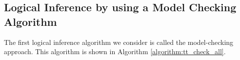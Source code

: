 %
%






\subsection{Logical Inference by using a Model Checking Algorithm}
\label{subsubsec:Inference_Model_Checking}

The first logical inference algorithm we consider is called the model-checking approach. This algorithm is shown in Algorithm \ref{algorithm:tt_check_all}.

